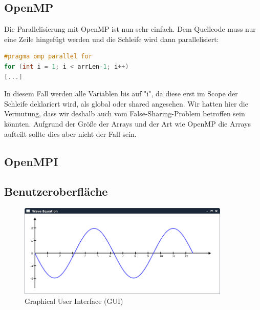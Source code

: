 \subsection{OpenMP}
Die Parallelisierung mit OpenMP ist nun sehr einfach. Dem Quellcode muss nur eine Zeile hingefügt werden und die Schleife wird dann parallelisiert:

\begin{lstlisting}[language=C]
#pragma omp parallel for
for (int i = 1; i < arrLen-1; i++)
[...]
\end{lstlisting}

In diesem Fall werden alle Variablen bis auf "i", da diese erst im Scope der Schleife deklariert wird, als global oder shared angesehen. Wir hatten hier die Vermutung, dass wir deshalb auch vom False-Sharing-Problem betroffen sein könnten. Aufgrund der Größe der Arrays und der Art wie OpenMP die Arrays aufteilt sollte dies aber nicht der Fall sein.

\subsection{OpenMPI}


\subsection{Benutzeroberfläche}

\begin{figure}[H]
	\centering
	\includegraphics[width=0.9\textwidth]{pictures/gui}
	\caption{Graphical User Interface (GUI)}
	\label{fig:gui}
\end{figure}